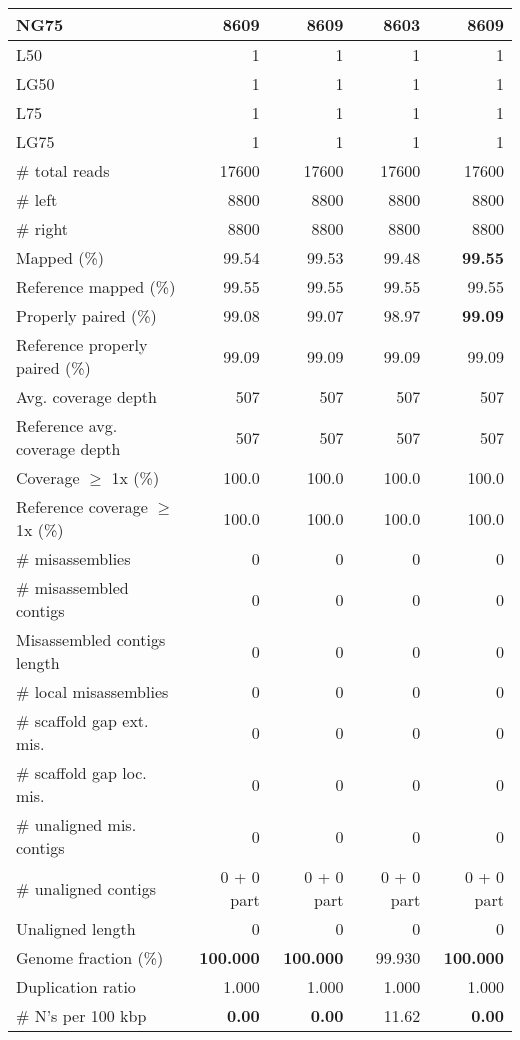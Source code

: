\documentclass[12pt,a4paper]{article}
\begin{document}
\begin{table}[ht]
\begin{center}
\begin{tabular}{|l*{4}{|r}|}
NG75 & {\bf 8609} & {\bf 8609} & 8603 & {\bf 8609} \\ \hline
L50 & 1 & 1 & 1 & 1 \\ \hline
LG50 & 1 & 1 & 1 & 1 \\ \hline
L75 & 1 & 1 & 1 & 1 \\ \hline
LG75 & 1 & 1 & 1 & 1 \\ \hline
\# total reads & 17600 & 17600 & 17600 & 17600 \\ \hline
\# left & 8800 & 8800 & 8800 & 8800 \\ \hline
\# right & 8800 & 8800 & 8800 & 8800 \\ \hline
Mapped (\%) & 99.54 & 99.53 & 99.48 & {\bf 99.55} \\ \hline
Reference mapped (\%) & 99.55 & 99.55 & 99.55 & 99.55 \\ \hline
Properly paired (\%) & 99.08 & 99.07 & 98.97 & {\bf 99.09} \\ \hline
Reference properly paired (\%) & 99.09 & 99.09 & 99.09 & 99.09 \\ \hline
Avg. coverage depth & 507 & 507 & 507 & 507 \\ \hline
Reference avg. coverage depth & 507 & 507 & 507 & 507 \\ \hline
Coverage $\geq$ 1x (\%) & 100.0 & 100.0 & 100.0 & 100.0 \\ \hline
Reference coverage $\geq$ 1x (\%) & 100.0 & 100.0 & 100.0 & 100.0 \\ \hline
\# misassemblies & 0 & 0 & 0 & 0 \\ \hline
\# misassembled contigs & 0 & 0 & 0 & 0 \\ \hline
Misassembled contigs length & 0 & 0 & 0 & 0 \\ \hline
\# local misassemblies & 0 & 0 & 0 & 0 \\ \hline
\# scaffold gap ext. mis. & 0 & 0 & 0 & 0 \\ \hline
\# scaffold gap loc. mis. & 0 & 0 & 0 & 0 \\ \hline
\# unaligned mis. contigs & 0 & 0 & 0 & 0 \\ \hline
\# unaligned contigs & 0 + 0 part & 0 + 0 part & 0 + 0 part & 0 + 0 part \\ \hline
Unaligned length & 0 & 0 & 0 & 0 \\ \hline
Genome fraction (\%) & {\bf 100.000} & {\bf 100.000} & 99.930 & {\bf 100.000} \\ \hline
Duplication ratio & 1.000 & 1.000 & 1.000 & 1.000 \\ \hline
\# N's per 100 kbp & {\bf 0.00} & {\bf 0.00} & 11.62 & {\bf 0.00} \\ \hline

\end{tabular}
\end{center}
\end{table}
\end{document}
